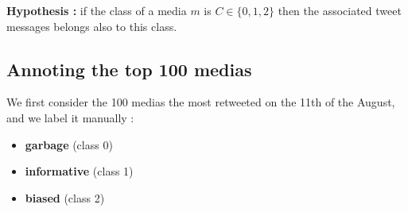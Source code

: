 \documentclass[a4paper,twoside,12pt,openright]{report}
\begin{document}
\textbf{Hypothesis :} if the class of a media $m$ is $C \in \{0,1,2\}$ then the associated tweet messages belongs also to this class.

\subsection{Annoting the top 100 medias}
\label{annotingTopMediasSection}

We first consider the 100 medias the most retweeted on the 11th of the August, and we label it manually :
\begin{itemize}
\item \textbf{garbage} (class 0)
\item \textbf{informative} (class 1)
\item \textbf{biased} (class 2)
\end{itemize}
\end{document}
